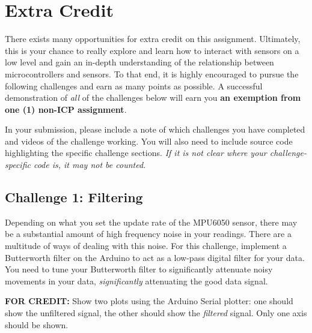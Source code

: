 \section*{Extra Credit} 
There exists many opportunities for extra credit on this assignment. 
Ultimately, this is your chance to really explore and learn how to interact with sensors on a low level and gain an in-depth understanding of the relationship between microcontrollers and sensors.
To that end, it is highly encouraged to pursue the following challenges and earn as many points as possible.
A successful demonstration of \emph{all} of the challenges below will earn you \textbf{an exemption from one (1) non-ICP assignment}.

In your submission, please include a note of which challenges you have completed and videos of the challenge working. 
You will also need to include source code highlighting the specific challenge sections.
\emph{If it is not clear where your challenge-specific code is, it may not be counted.}

    \subsection*{Challenge 1: Filtering}
    Depending on what you set the update rate of the MPU6050 sensor, there may be a substantial amount of high frequency noise in your readings.
    There are a multitude of ways of dealing with this noise.
    For this challenge, implement a Butterworth filter on the Arduino to act as a low-pass digital filter for your data. 
    You need to tune your Butterworth filter to significantly attenuate noisy movements in your data, \textit{significantly} attenuating the good data signal.
    
    \textbf{FOR CREDIT:} Show two plots using the Arduino Serial plotter: one should show the unfiltered signal, the other should show the \textit{filtered} signal. 
    Only one axis should be shown.

